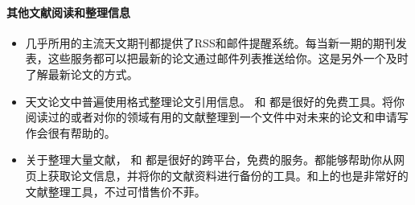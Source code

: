 \documentclass[letterpaper,10pt,english]{sphinxmanual}
\begin{document}
\paragraph{其他文献阅读和整理信息}
\label{\detokenize{resource/research/getting_started_cn:id17}}\begin{itemize}
\item {} 
几乎所用的主流天文期刊都提供了RSS和邮件提醒系统。每当新一期的期刊发表，这些服务都可以把最新的论文通过邮件列表推送给你。这是另外一个及时了解最新论文的方式。

\item {} 
天文论文中普遍使用格式整理论文引用信息。
和 
都是很好的免费工具。将你阅读过的或者对你的领域有用的文献整理到一个文件中对未来的论文和申请写作会很有帮助的。

\item {} 
关于整理大量文献，
和 
都是很好的跨平台，免费的服务。都能够帮助你从网页上获取论文信息，并将你的文献资料进行备份的工具。和上的也是非常好的文献整理工具，不过可惜售价不菲。

\end{itemize}
\end{document}
